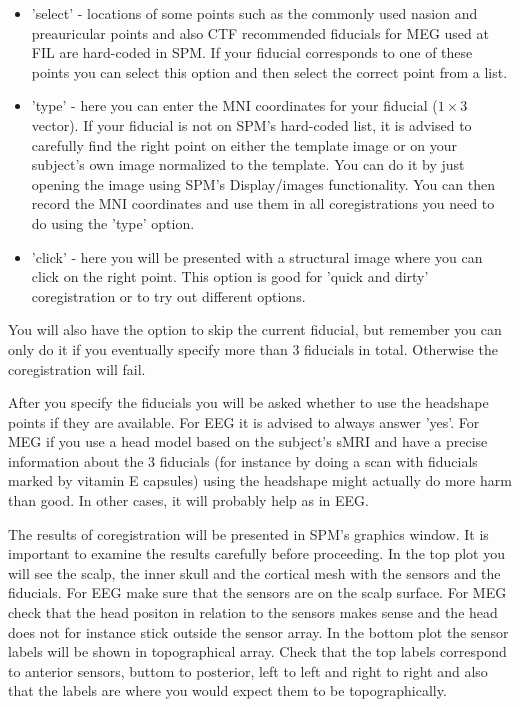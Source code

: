 \begin{itemize}
\item 'select' - locations of some points such as the commonly used nasion and preauricular points and also
CTF recommended fiducials for MEG used at FIL are hard-coded in SPM. If your fiducial corresponds to one of these
points you can select this option and then select the correct point from a list.
\item 'type' - here you can enter the MNI coordinates for your fiducial ($1 \times 3$ vector). If your fiducial is not
on SPM's hard-coded list, it is advised to carefully find the right point on either the template image or
on your subject's own image normalized to the template. You can do it by just opening the image using SPM's
Display/images functionality. You can then record the MNI coordinates and use them in all coregistrations you
need to do using the 'type' option.
\item 'click' - here you will be presented with a structural image where you can click on the right point. 
This option is good for 'quick and dirty' coregistration or to try out different options. 
\end{itemize}

You will also have the option to skip the current fiducial, but remember you can only do it if you eventually
specify more than 3 fiducials in total. Otherwise the coregistration will fail. 

After you specify the fiducials you will be asked whether to use the headshape points if they are available. 
For EEG it is advised to always answer 'yes'. For MEG if you use a head model based on the subject's sMRI and have
a precise information about the 3 fiducials (for instance by doing a scan with fiducials marked by vitamin E capsules)
using the headshape might actually do more harm than good. In other cases, it will probably help as in EEG. 

The results of coregistration will be presented in SPM's graphics window. It is important to examine the results
carefully before proceeding. In the top plot you will see the scalp, the inner skull and the cortical mesh
with the sensors and the fiducials. For EEG make sure that the sensors are on the scalp surface. For MEG check
that the head positon in relation to the sensors makes sense and the head does not for instance stick outside
the sensor array. In the bottom plot the sensor labels will be shown in topographical array. Check that the top
labels correspond to anterior sensors, buttom to posterior, left to left and right to right and also that the labels
are where you would expect them to be topographically.   

